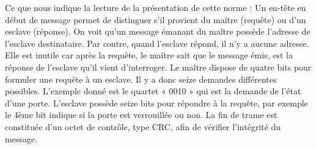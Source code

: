 \documentclass[10pt]{article}
\begin{document}
Ce que nous indique la lecture de la présentation de cette norme :
Un en-tête en début de message permet de distinguer s’il provient du maître (requête) ou d’un esclave (réponse).
On voit qu’un message émanant du maître possède l’adresse de l’esclave destinataire.
Par contre, quand l’esclave répond, il n’y a aucune adresse. Elle est inutile car après la requête, le maître sait que le message émis, est la réponse de l’esclave qu’il vient d’interroger.
Le maître dispose de quatre bits pour formuler une requête à un esclave. Il y a donc seize demandes différentes possibles. L’exemple donné est le quartet « 0010 » qui est la demande de l’état d’une porte. L’esclave possède seize bits pour répondre à la requête, par exemple le 4ème bit indique si la porte est verrouillée ou non.
La fin de trame est constituée d’un octet de contrôle, type CRC, afin de vérifier l’intégrité du message.


\begin{thebibliography}{2}

\end{thebibliography}
\end{document}
